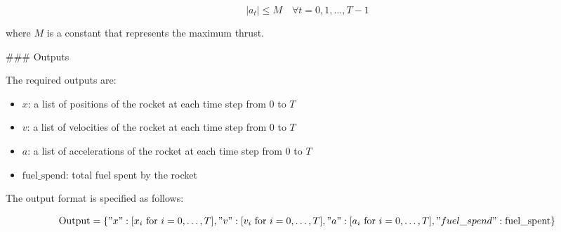 \documentclass{article}
\begin{document}
\[
|a_t| \leq M \quad \forall t = 0, 1, \ldots, T-1
\]

where \( M \) is a constant that represents the maximum thrust.

### Outputs

The required outputs are:

\begin{itemize}
    \item \( x \): a list of positions of the rocket at each time step from 0 to \( T \)
    \item \( v \): a list of velocities of the rocket at each time step from 0 to \( T \)
    \item \( a \): a list of accelerations of the rocket at each time step from 0 to \( T \)
    \item \( \text{fuel\_spend} \): total fuel spent by the rocket
\end{itemize}

The output format is specified as follows:

\[
\text{Output} = \{
    "x": [x_i \text{ for } i = 0, \ldots, T],
    "v": [v_i \text{ for } i = 0, \ldots, T],
    "a": [a_i \text{ for } i = 0, \ldots, T],
    "fuel\_spend": \text{fuel\_spent}
\}
\]
\end{document}
